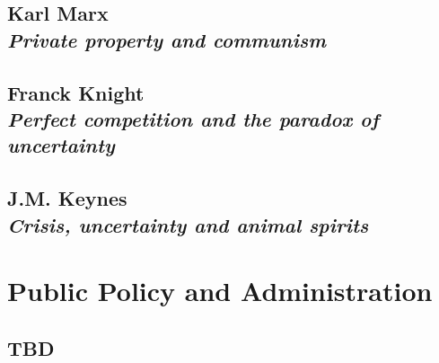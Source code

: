\documentclass[dvipsnames,12pt]{book}
\begin{document}
    \chapter[Private property and communism]{Karl Marx \\[0.6cm] \textit{Private property and communism}}

    \chapter[Perfect competition and paradox of uncertainty]{Franck Knight\\[0.6cm] \textit{Perfect competition and the paradox of uncertainty}}

    \chapter[Crisis, uncertainty and animal spirits]{J.M. Keynes \\[0.6cm] \textit{Crisis, uncertainty and animal spirits}}

\part{Public Policy and Administration}

    \chapter{TBD}
\end{document}
